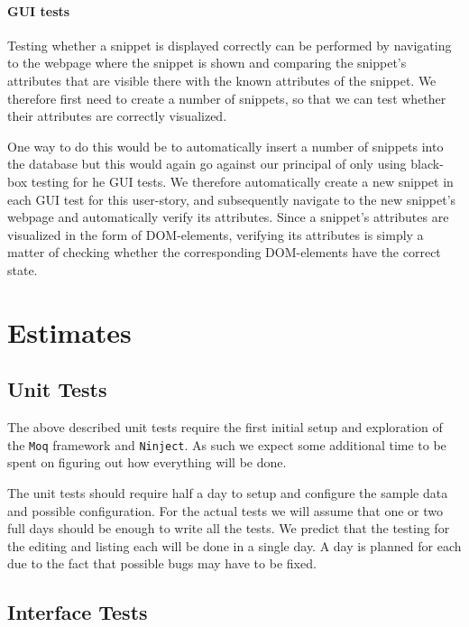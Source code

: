 \documentclass[10pt,a4paper,BCOR12mm, headexclude, footexclude,
  twoside, openright]{scrartcl}
\numberwithin{equation}{section} %
\numberwithin{figure}{section} %
\numberwithin{table}{section} %
\begin{document}
\paragraph{GUI tests}
Testing whether a snippet is displayed correctly can be performed by navigating to the webpage where the snippet is shown and comparing the snippet's attributes that are visible there with the known attributes of the snippet.
We therefore first need to create a number of snippets, so that we can test whether their attributes are correctly visualized.

One way to do this would be to automatically insert a number of snippets into the database but this would again go against our principal of only using black-box testing for he GUI tests.
We therefore automatically create a new snippet in each GUI test for this user-story, and subsequently navigate to the new snippet's webpage and automatically verify its attributes.
Since a snippet's attributes are visualized in the form of DOM-elements, verifying its attributes is simply a matter of checking whether the corresponding DOM-elements have the correct state.


\section{Estimates}
\subsection{Unit Tests}
The above described unit tests require the first initial setup and exploration
of the \texttt{Moq} framework and \texttt{Ninject}. As such we expect some
additional time to be spent on figuring out how everything will be done.

The unit tests should require half a day to setup and configure the sample data
and possible configuration. For the actual tests we will assume that one or two
full days should be enough to write all the tests. We predict that the testing
for the editing and listing each will be done in a single day. A day is planned
for each due to the fact that possible bugs may have to be fixed.
\subsection{Interface Tests}
\end{document}
